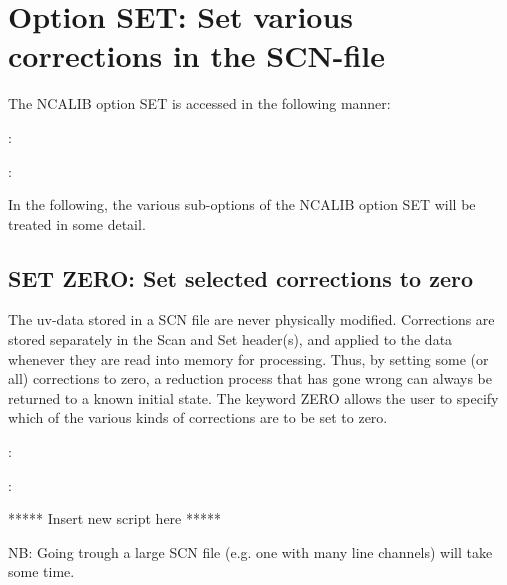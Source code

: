 
\section{Option SET: Set various corrections in the SCN-file}
\label{.option.set}

	The NCALIB option SET is accessed in the following manner:


:

:

In the following, the various sub-options of the NCALIB option SET will be
treated in some detail.



\subsection{SET ZERO: Set selected corrections to zero}
\label{.set.zero}

The uv-data stored in a SCN file are never physically modified. Corrections are
stored separately in the Scan and Set header(s), and applied to the data
whenever they are read into memory for processing. Thus, by setting some (or
all) corrections to zero, a reduction process that has gone wrong can always be
returned to a known initial state. The keyword ZERO allows the user to specify
which of the various kinds of corrections are to be set to zero.

:

:

***** Insert new script here *****

NB: Going trough a large SCN file (e.g. one with many line channels) will take
some time.


